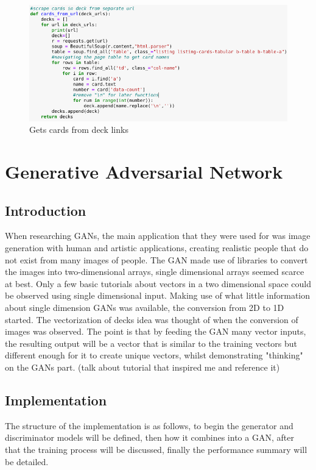 \documentclass{report} %
\begin{document}
\begin{figure}[H]
\centering
\includegraphics[width=1.25\textwidth]{cardsURL}
\caption{Gets cards from deck links\protect}
\label{board}
\end{figure}

\section{Generative Adversarial Network}
\subsection{Introduction}
When researching GANs, the main application that they were used for was image generation with human and artistic applications, creating realistic people that do not exist from many images of people. The GAN made use of libraries to convert the images into two-dimensional arrays, single dimensional arrays seemed scarce at best. Only a few basic tutorials about vectors in a two dimensional space could be observed using single dimensional input. Making use of what little information about single dimension GANs was available, the conversion from 2D to 1D started. The vectorization of decks idea was thought of when the conversion of images was observed. The point is that by feeding the GAN many vector inputs, the resulting output will be a vector that is similar to the training vectors but different enough for it to create unique vectors, whilst demonstrating "thinking" on the GANs part. (talk about tutorial that inspired me and reference it)
\subsection{Implementation}
The structure of the implementation is as follows, to begin the generator and discriminator models will be defined, then how it combines into a GAN, after that the training process will be discussed, finally the performance summary will be detailed.
\end{document}
